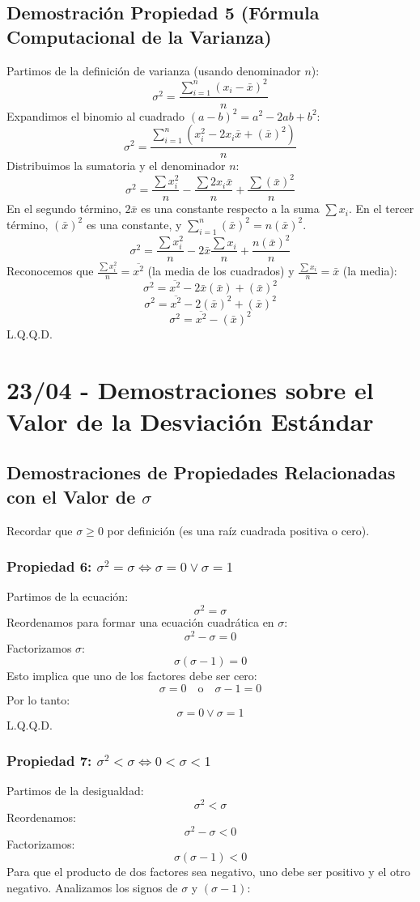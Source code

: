\documentclass[12pt, letterpaper]{article}
\begin{document}
\subsection{Demostración Propiedad 5 (Fórmula Computacional de la Varianza)}
Partimos de la definición de varianza (usando denominador $n$):
\[\sigma^2=\frac{\sum_{i=1}^{n} (x_i-\bar{x})^2}{n}\]
Expandimos el binomio al cuadrado $(a-b)^2 = a^2 - 2ab + b^2$:
\[\sigma^2=\frac{\sum_{i=1}^{n} (x_i^2 - 2x_i\bar{x} + (\bar{x})^2)}{n}\]
Distribuimos la sumatoria y el denominador $n$:
\[\sigma^2=\frac{\sum x_i^2}{n} - \frac{\sum 2x_i\bar{x}}{n} + \frac{\sum (\bar{x})^2}{n}\]
En el segundo término, $2\bar{x}$ es una constante respecto a la suma $\sum x_i$. En el tercer término, $(\bar{x})^2$ es una constante, y $\sum_{i=1}^{n} (\bar{x})^2 = n(\bar{x})^2$.
\[\sigma^2=\frac{\sum x_i^2}{n} - 2\bar{x} \frac{\sum x_i}{n} + \frac{n(\bar{x})^2}{n}\]
Reconocemos que $\frac{\sum x_i^2}{n} = \overline{x^2}$ (la media de los cuadrados) y $\frac{\sum x_i}{n} = \bar{x}$ (la media):
\[\sigma^2=\overline{x^2} - 2\bar{x} (\bar{x}) + (\bar{x})^2\]
\[\sigma^2=\overline{x^2} - 2(\bar{x})^2 + (\bar{x})^2\]
\[\sigma^2=\overline{x^2} - (\bar{x})^2\]
L.Q.Q.D.
\newpage

\section{23/04 - Demostraciones sobre el Valor de la Desviación Estándar}
\subsection{Demostraciones de Propiedades Relacionadas con el Valor de $\sigma$}
Recordar que $\sigma \ge 0$ por definición (es una raíz cuadrada positiva o cero).

\subsubsection{Propiedad 6: $\sigma^2 = \sigma \iff \sigma=0 \vee \sigma=1$}
Partimos de la ecuación:
\[\sigma^2=\sigma \]
Reordenamos para formar una ecuación cuadrática en $\sigma$:
\[\sigma^2-\sigma=0 \]
Factorizamos $\sigma$:
\[\sigma(\sigma-1)=0 \]
Esto implica que uno de los factores debe ser cero:
\[\sigma=0 \quad \text{o} \quad \sigma-1=0 \]
Por lo tanto:
\[\sigma=0 \vee \sigma=1 \]
L.Q.Q.D.

\subsubsection{Propiedad 7: $\sigma^2 < \sigma \iff 0 < \sigma < 1$}
Partimos de la desigualdad:
\[\sigma^2 < \sigma \]
Reordenamos:
\[\sigma^2-\sigma < 0 \]
Factorizamos:
\[\sigma(\sigma-1) < 0 \]
Para que el producto de dos factores sea negativo, uno debe ser positivo y el otro negativo. Analizamos los signos de $\sigma$ y $(\sigma-1)$:
\end{document}
